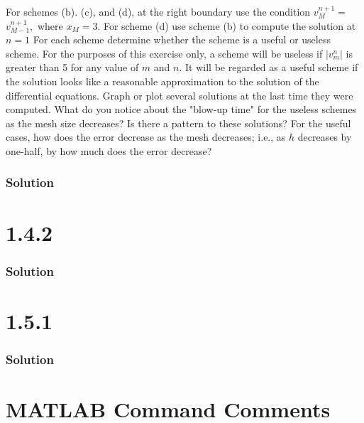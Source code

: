 \documentclass[12pt]{article}
\begin{document}
For schemes (b). (c), and (d), at the right boundary use the condition $v_{M}^{n+1}=$ $v_{M-1}^{n+1},$ where $x_{M}=3 .$ For scheme (d) use scheme (b) to compute the solution at $n=1$
For each scheme determine whether the scheme is a useful or useless scheme. For the purposes of this exercise only, a scheme will be useless if $\left|v_{m}^{n}\right|$ is greater than
5 for any value of $m$ and $n .$ It will be regarded as a useful scheme if the solution looks like a reasonable approximation to the solution of the differential equations. Graph or plot several solutions at the last time they were computed. What do you notice about the "blow-up time" for the useless schemes as the mesh size decreases? Is there a pattern to these solutions? For the useful cases, how does the error decrease
as the mesh decreases; i.e., as $h$ decreases by one-half, by how much does the error decrease?
\subsubsection*{Solution}

\section*{1.4.2}
\subsubsection*{Solution}

\section*{1.5.1}
\subsubsection*{Solution}

\section*{MATLAB Command Comments}
\end{document}
